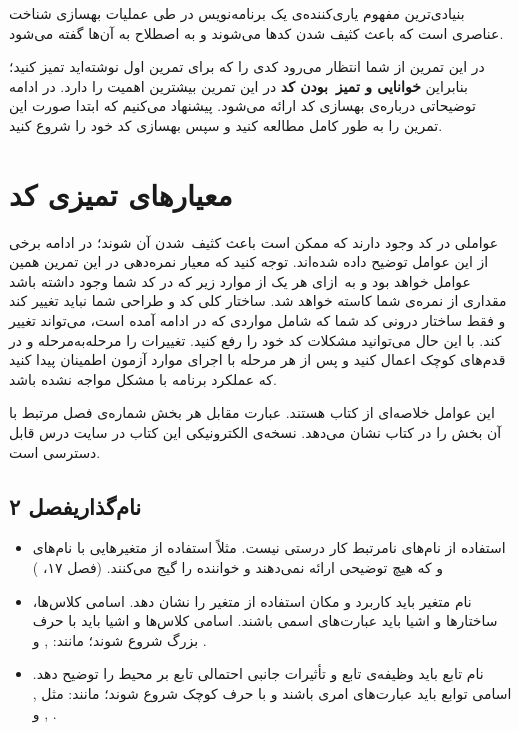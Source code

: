 \documentclass{utap}
\newcommand{\chap}[1]{\hfill\normalfont\normalsize فصل #1}
\begin{document}
بنیادی‌ترین مفهوم یاری‌کننده‌ی یک برنامه‌نویس در طی عملیات بهسازی شناخت عناصری است که باعث کثیف شدن کدها می‌شوند و به اصطلاح به آن‌ها  گفته می‌شود.

در این تمرین از شما انتظار می‌رود کدی را که برای تمرین اول نوشته‌اید تمیز کنید؛ بنابراین \textbf{خوانایی و تمیز~بودن کد} در این تمرین بیشترین اهمیت را دارد. در ادامه توضیحاتی درباره‌ی بهسازی کد ارائه می‌شود. پیشنهاد می‌کنیم که ابتدا صورت این تمرین را به طور کامل مطالعه کنید و سپس بهسازی کد خود را شروع کنید.

\section{معیارهای تمیزی کد}
عواملی در کد وجود دارند که ممکن است باعث کثیف~شدن آن شوند؛ در ادامه برخی از این عوامل توضیح داده شده‌اند. توجه کنید که معیار نمره‌دهی در این تمرین همین عوامل خواهد بود و به~ازای هر یک از موارد زیر که در کد شما وجود داشته باشد مقداری از نمره‌ی شما کاسته خواهد شد. ساختار کلی کد و طراحی شما نباید تغییر کند و فقط ساختار درونی کد شما که شامل مواردی که در ادامه آمده است، می‌تواند تغییر کند. با این حال می‌توانید مشکلات کد خود را رفع کنید. تغییرات را مرحله‌به‌مرحله و در قدم‌های کوچک اعمال کنید و پس از هر مرحله با اجرای موارد آزمون اطمینان پیدا کنید که عملکرد برنامه با مشکل مواجه نشده باشد.

این عوامل خلاصه‌ای از کتاب  هستند. عبارت مقابل هر بخش شماره‌ی فصل مرتبط با آن بخش را در کتاب نشان می‌دهد.
نسخه‌ی الکترونیکی این کتاب در سایت درس قابل دسترسی است.

\subsection[نام‌گذاری]{نام‌گذاری\chap{۲}}
\begin{itemize}
    \item
استفاده از نام‌های نامرتبط کار درستی نیست. مثلاً استفاده از متغیر‌هایی با نام‌های  و  که هیچ توضیحی ارائه نمی‌دهند و خواننده را گیج می‌کنند. (فصل ۱۷، )
    \item
نام متغیر باید کاربرد و مکان استفاده از متغیر را نشان دهد.
اسامی کلاس‌ها، ساختارها و اشیا باید عبارت‌های اسمی باشند. اسامی کلاس‌ها و اشیا باید با حرف بزرگ شروع شوند؛ مانند: ,  و .
    \item
نام تابع باید وظیفه‌ی تابع و تأثیرات جانبی احتمالی تابع بر محیط را توضیح دهد.
اسامی توابع باید عبارت‌های امری باشند و با حرف کوچک شروع شوند؛ مانند: مثل , ,  و .
\end{itemize}
\end{document}
